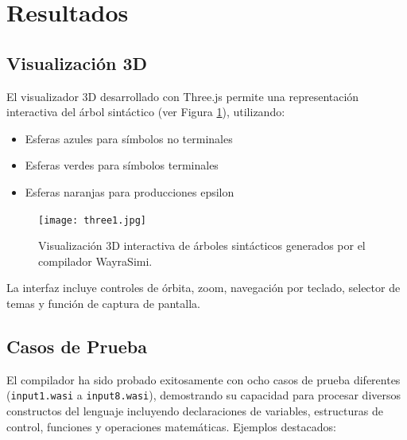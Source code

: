 \documentclass[conference]{IEEEtran}
\begin{document}
\section{Resultados}

\subsection{Visualización 3D}

El visualizador 3D desarrollado con Three.js permite una representación interactiva del árbol sintáctico (ver Figura \ref{fig:3d_tree}), utilizando:
\begin{itemize}
\item Esferas azules para símbolos no terminales
\item Esferas verdes para símbolos terminales
\item Esferas naranjas para producciones epsilon
\end{itemize}

\begin{figure}[htbp]
\centering
\texttt{[image: three1.jpg]}
\caption{Visualización 3D interactiva de árboles sintácticos generados por el compilador WayraSimi.}
\label{fig:3d_tree}
\end{figure}

La interfaz incluye controles de órbita, zoom, navegación por teclado, selector de temas y función de captura de pantalla.

\subsection{Casos de Prueba}

El compilador ha sido probado exitosamente con ocho casos de prueba diferentes (\texttt{input1.wasi} a \texttt{input8.wasi}), demostrando su capacidad para procesar diversos constructos del lenguaje incluyendo declaraciones de variables, estructuras de control, funciones y operaciones matemáticas. Ejemplos destacados:
\end{document}

